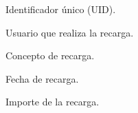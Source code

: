 \begin{RFUsuarioAutenticado}
\begin{RFUsuarioAutenticado}
        \begin{RFUsuarioAutenticado}
            \item Identificador único (UID).
            \item Usuario que realiza la recarga.
            \item Concepto de recarga.
            \item Fecha de recarga.
            \item Importe de la recarga.
        \end{RFUsuarioAutenticado}
    \end{RFUsuarioAutenticado}
\end{RFUsuarioAutenticado}